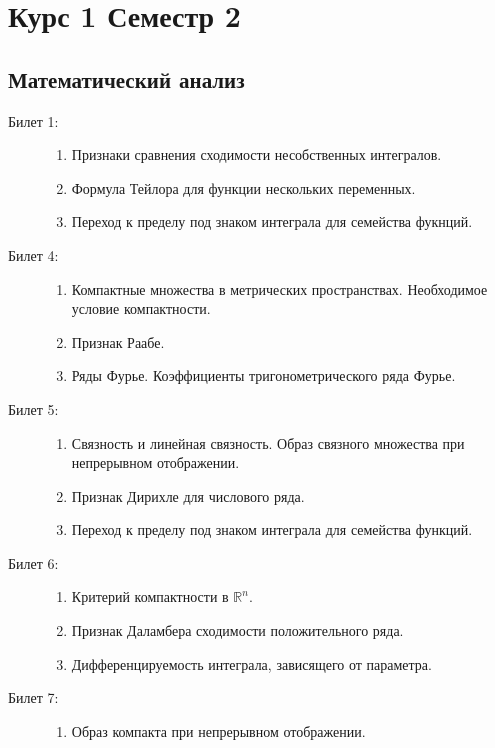 \documentclass{article}
\begin{document}
\section*{Курс 1 Семестр 2}
\subsection*{Математический анализ}
\begin{description}
	\item[Билет 1:]\phantom{}
	\begin{enumerate}
		\item Признаки сравнения сходимости несобственных интегралов.
		\item Формула Тейлора для функции нескольких переменных.
		\item Переход к пределу под знаком интеграла для
		      семейства фукнций.
	\end{enumerate}
	\item[Билет 4:]\phantom{}
	\begin{enumerate}
		\item Компактные множества в метрических пространствах.
		      Необходимое условие компактности.
		\item Признак Раабе.
		\item Ряды Фурье. Коэффициенты тригонометрического ряда Фурье.
	\end{enumerate}
	\item[Билет 5:]\phantom{}
	\begin{enumerate}
		\item Связность и линейная связность. Образ связного множества
		      при непрерывном отображении.
		\item Признак Дирихле для числового ряда.
		\item Переход к пределу под знаком интеграла для
		      семейства функций.
	\end{enumerate}
	\item[Билет 6:]\phantom{}
	\begin{enumerate}
		\item Критерий компактности в $\mathbb{R}^n$.
		\item Признак Даламбера сходимости положительного ряда.
		\item Дифференцируемость интеграла, зависящего от параметра.
	\end{enumerate}
	\item[Билет 7:]\phantom{}
	\begin{enumerate}
		\item Образ компакта при непрерывном отображении.

\end{enumerate}
\end{description}
\end{document}
